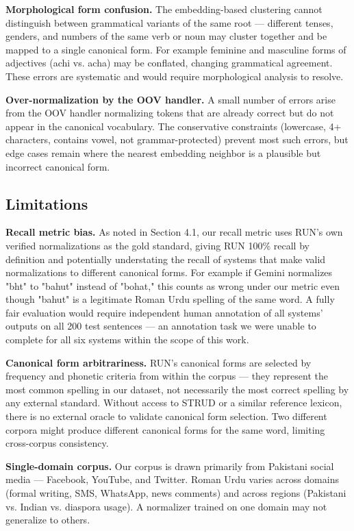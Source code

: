 \documentclass[11pt]{article}
\begin{document}
\textbf{Morphological form confusion.} The embedding-based clustering cannot distinguish between grammatical variants of the same root — different tenses, genders, and numbers of the same verb or noun may cluster together and be mapped to a single canonical form. For example feminine and masculine forms of adjectives (achi vs. acha) may be conflated, changing grammatical agreement. These errors are systematic and would require morphological analysis to resolve.

\textbf{Over-normalization by the OOV handler.} A small number of errors arise from the OOV handler normalizing tokens that are already correct but do not appear in the canonical vocabulary. The conservative constraints (lowercase, 4+ characters, contains vowel, not grammar-protected) prevent most such errors, but edge cases remain where the nearest embedding neighbor is a plausible but incorrect canonical form.


\subsection{Limitations}
\textbf{Recall metric bias.} As noted in Section 4.1, our recall metric uses RUN's own verified normalizations as the gold standard, giving RUN 100\% recall by definition and potentially understating the recall of systems that make valid normalizations to different canonical forms. For example if Gemini normalizes "bht" to "bahut" instead of "bohat," this counts as wrong under our metric even though "bahut" is a legitimate Roman Urdu spelling of the same word. A fully fair evaluation would require independent human annotation of all systems' outputs on all 200 test sentences — an annotation task we were unable to complete for all six systems within the scope of this work.

\textbf{Canonical form arbitrariness.} RUN's canonical forms are selected by frequency and phonetic criteria from within the corpus — they represent the most common spelling in our dataset, not necessarily the most correct spelling by any external standard. Without access to STRUD \cite{tasadduq2022strud} or a similar reference lexicon, there is no external oracle to validate canonical form selection. Two different corpora might produce different canonical forms for the same word, limiting cross-corpus consistency.

\textbf{Single-domain corpus.} Our corpus is drawn primarily from Pakistani social media — Facebook, YouTube, and Twitter. Roman Urdu varies across domains (formal writing, SMS, WhatsApp, news comments) and across regions (Pakistani vs. Indian vs. diaspora usage). A normalizer trained on one domain may not generalize to others.
\end{document}
